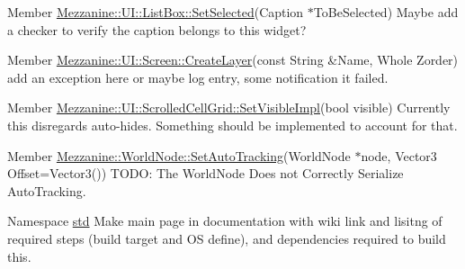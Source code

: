 \label{todo__todo000026}
\hypertarget{todo__todo000026}{}
 
\begin{DoxyDescription}
\item[Member \hyperlink{classMezzanine_1_1UI_1_1ListBox_a81ddebed01b1503478c2fa7b75ce4b24}{Mezzanine::UI::ListBox::SetSelected}(Caption $\ast$ToBeSelected) ]Maybe add a checker to verify the caption belongs to this widget? 
\end{DoxyDescription}

\label{todo__todo000027}
\hypertarget{todo__todo000027}{}
 
\begin{DoxyDescription}
\item[Member \hyperlink{classMezzanine_1_1UI_1_1Screen_a4c7471ee8b43649a5eab8c43e28f31b7}{Mezzanine::UI::Screen::CreateLayer}(const String \&Name, Whole Zorder) ]add an exception here or maybe log entry, some notification it failed. 
\end{DoxyDescription}

\label{todo__todo000028}
\hypertarget{todo__todo000028}{}
 
\begin{DoxyDescription}
\item[Member \hyperlink{classMezzanine_1_1UI_1_1ScrolledCellGrid_a259a2f007e7afc5b2fa967c02b0d5627}{Mezzanine::UI::ScrolledCellGrid::SetVisibleImpl}(bool visible) ]Currently this disregards auto-\/hides. Something should be implemented to account for that. 
\end{DoxyDescription}

\label{todo__todo000031}
\hypertarget{todo__todo000031}{}
 
\begin{DoxyDescription}
\item[Member \hyperlink{classMezzanine_1_1WorldNode_accb11fd94c98482d5d1b28894a1f4d9b}{Mezzanine::WorldNode::SetAutoTracking}(WorldNode $\ast$node, Vector3 Offset=Vector3()) ]TODO: The WorldNode Does not Correctly Serialize AutoTracking. 
\end{DoxyDescription}

\label{todo__todo000008}
\hypertarget{todo__todo000008}{}
 
\begin{DoxyDescription}
\item[Namespace \hyperlink{namespacestd}{std} ]Make main page in documentation with wiki link and lisitng of required steps (build target and OS define), and dependencies required to build this. 
\end{DoxyDescription}